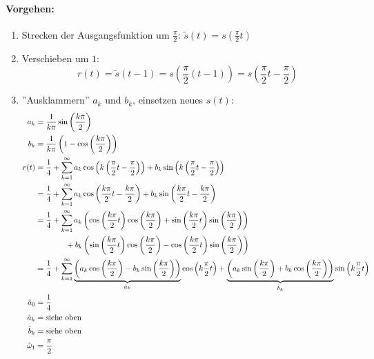 \paragraph{Vorgehen:}
\begin{enumerate}
	\item Strecken der Ausgangsfunktion um $\frac{\pi}{2}$: $ \tilde{s}(t) = s\left(\frac{\pi}{2} t\right)$
	\item Verschieben um $1$: \[
		r(t) = \tilde{s}(t-1) = s\left(\frac{\pi}{2}(t-1)\right) = s\left(\frac{\pi}{2}t - \frac{\pi}{2}\right)
	\]
	\item ''Ausklammern'' $a_k$ und $b_k$, einsetzen neues $s(t)$: \begin{align*}
	a_k &= \frac{1}{k\pi} \sin\left(\frac{k\pi}{2}\right) \\
	b_k &= \frac{1}{k\pi} \left(1 - \cos\left(\frac{k\pi}{2}\right)\right) \\
	r(t) &= \frac{1}{4} + \sum^\infty_{k=1} a_k \cos\left(k \left(\frac{\pi}{2}t
		- \frac{\pi}{2} \right)\right)
		+ b_k \sin\left(k\left(\frac{\pi}{2} t
		- \frac{\pi}{2}\right)\right) \\
	&= \frac{1}{4} + \sum^\infty_{k=1} a_k \cos\left(\frac{k\pi}{2} t - \frac{k \pi}{2}\right) + b_k \sin\left( \frac{k\pi}{2} t - \frac{k\pi}{2}\right) \\
	&= \frac{1}{4} + \sum^\infty_{k=1}
		a_k \left(\cos\left(\frac{k\pi}{2} t\right)\cos\left(\frac{k\pi}{2}\right) + \sin\left(\frac{k\pi}{2} t\right)\sin\left(\frac{k\pi}{2}\right) \right) \\
		&\hspace{1.35cm} + b_k \left(\sin\left(\frac{k\pi}{2} t\right)\cos\left(\frac{k\pi}{2}\right) - \cos\left(\frac{k\pi}{2} t\right)\sin\left(\frac{k\pi}{2}\right)\right) \\
	&= \frac{1}{4} + \sum^\infty_{k=1}
		\underbrace{\left( a_k \cos\left(\frac{k\pi}{2}\right) - b_k \sin\left(\frac{k\pi}{2}\right) \right)}_{\hat{a}_k} \cos\left(k\frac{\pi}{2} t\right) 
		+ \underbrace{\left( a_k \sin\left(\frac{k\pi}{2}\right) + b_k \cos\left(\frac{k\pi}{2}\right) \right)}_{\hat{b}_k} \sin\left(k\frac{\pi}{2} t\right) \\
	\hat{a}_0 &= \frac{1}{4} \\
	\hat{a}_k &= \text{siehe oben} \\
	\hat{b}_k &= \text{siehe oben} \\
	\hat{\omega}_1 &= \frac{\pi}{2}
	\end{align*}


\end{enumerate}
